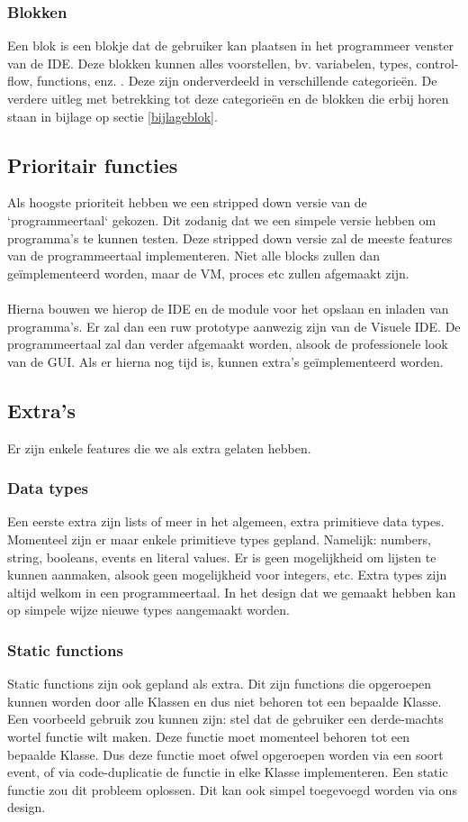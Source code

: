\documentclass[]{article}
\begin{document}
 
\subsubsection{Blokken}
\label{primitive}
Een blok is een blokje dat de gebruiker kan plaatsen in het programmeer venster van de IDE. Deze blokken kunnen alles voorstellen, bv. variabelen, types, control-flow, functions, enz. . Deze zijn onderverdeeld in verschillende categorie\"en. De verdere uitleg met betrekking tot deze categorie\"en en de blokken die erbij horen staan in bijlage op sectie \ref{bijlageblok}.

\subsection{Prioritair functies}
Als hoogste prioriteit hebben we een stripped down versie van de `programmeertaal` gekozen. Dit zodanig dat we een simpele versie hebben om programma's te kunnen testen. Deze stripped down versie zal de meeste features van de programmeertaal implementeren. Niet alle blocks zullen dan ge\"{i}mplementeerd worden, maar de VM, proces etc zullen afgemaakt zijn.\\\\
Hierna bouwen we hierop de IDE en de module voor het opslaan en inladen van programma's. Er zal dan een ruw prototype aanwezig zijn van de Visuele IDE.
De programmeertaal zal dan verder afgemaakt worden, alsook de professionele look van de GUI. Als er hierna nog tijd is, kunnen extra's ge\"{i}mplementeerd worden. 
  
\subsection{Extra's}
Er zijn enkele features die we als extra gelaten hebben.
\subsubsection{Data types} 
Een eerste extra zijn lists of meer in het algemeen, extra primitieve data types. Momenteel zijn er maar enkele primitieve types gepland. Namelijk: numbers, string, booleans, events en literal values. Er is geen mogelijkheid om lijsten te kunnen aanmaken, alsook geen mogelijkheid voor integers, etc. Extra types zijn altijd welkom in een programmeertaal. In het design dat we gemaakt hebben kan op simpele wijze nieuwe types aangemaakt worden.
 
\subsubsection{Static functions}
Static functions zijn ook gepland als extra. Dit zijn functions die opgeroepen kunnen worden door alle Klassen en dus niet behoren tot een bepaalde Klasse. Een voorbeeld gebruik zou kunnen zijn: stel dat de gebruiker een derde-machts wortel functie wilt maken. Deze functie moet momenteel behoren tot een bepaalde Klasse. Dus deze functie moet ofwel opgeroepen worden via een soort event, of via code-duplicatie de functie in elke Klasse implementeren. Een static functie zou dit probleem oplossen. Dit kan ook simpel toegevoegd worden via ons design.
 
\end{document}
